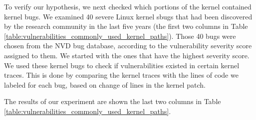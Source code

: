 To verify our hypothesis, we next checked which portions of
the kernel contained kernel bugs. We examined 40 severe Linux kernel
sbugs that had been discovered by the research community in the last five
years (the first two columns in Table
\ref{table:vulnerabilities_commonly_used_kernel_paths}).
Those 40 bugs were chosen from the NVD bug database, according to
the vulnerability severity score assigned to them. We started with the ones
that have the highest severity score.
We used these kernel bugs to check if vulnerabilities existed in certain
kernel traces. This is done by comparing the kernel traces with the lines
of code we labeled for each bug, based on change of lines in the
kernel patch.

The results of our experiment are shown the last two columns in Table \ref{table:vulnerabilities_commonly_used_kernel_paths}.

